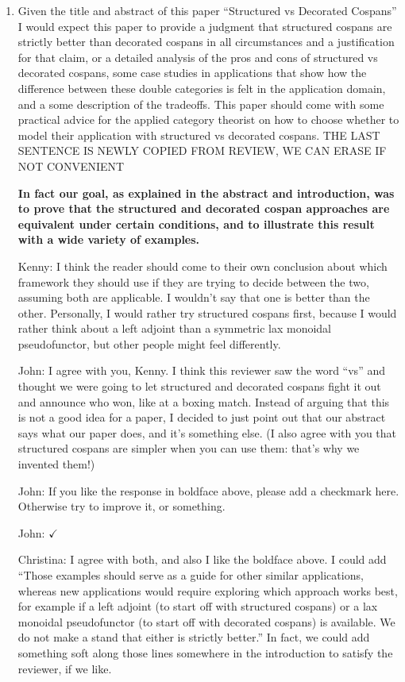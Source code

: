 \documentclass[reqno]{amsart}
\def\chris{\color{purple} Christina: }
\def\john{\color{red} John: }
\def\kenny{\color{blue} Kenny: }
\begin{document}
\begin{enumerate}
{\chris Second review starts here}
\item Given the title and abstract of this paper “Structured vs Decorated Cospans” I would expect this paper to provide a judgment that structured  cospans are strictly better than decorated cospans in all circumstances and a justification for that claim, or a detailed analysis of the pros and cons of 
structured vs decorated cospans, some case studies in applications that show how the difference between these double categories is felt in the 
application domain, and a some description of the tradeoffs. This paper should come with some practical advice for the applied category theorist on 
how to choose whether to model their application with structured vs decorated cospans. {THE LAST SENTENCE IS NEWLY COPIED FROM REVIEW, WE CAN ERASE 
IF NOT CONVENIENT}

{\bf In fact our goal, as explained in the abstract and introduction, was to prove that the structured and decorated cospan approaches are equivalent under certain conditions, and to illustrate this result with a wide variety of examples.}

{\kenny I think the reader should come to their own conclusion about which framework they should use if they are trying to decide between the two, assuming both are applicable. I wouldn't say that one is better than the other. Personally, I would rather try structured cospans first, because I would rather think about a left adjoint than a symmetric lax monoidal pseudofunctor, but other people might feel differently.} 

{\john I agree with you, Kenny.  I think this reviewer saw the word ``vs'' and thought we were going to let structured and decorated cospans fight it out and announce who won, like at a boxing match.   Instead of arguing that this is not a good idea for a paper, I decided to just point out that our abstract says what our paper does, and it's something else.   (I also agree with you that structured cospans are simpler when you can use them: that's why we invented them!)}

{\john If you like the response in boldface above, please add a checkmark here.  Otherwise try to
improve it, or something.}  

{\john $\checkmark$}

{\chris I agree with both, and also I like the boldface above. I could add ``Those examples should serve as a guide for other similar applications, 
whereas new applications would require exploring which approach works best, for example if a left adjoint (to start off with structured cospans) or a 
lax monoidal pseudofunctor (to start off with decorated cospans) is available. We do not make a stand that either is strictly better.'' In fact, we 
could add something soft along those lines somewhere in the introduction to satisfy the reviewer, if we like.}


\end{enumerate}
\end{document}
